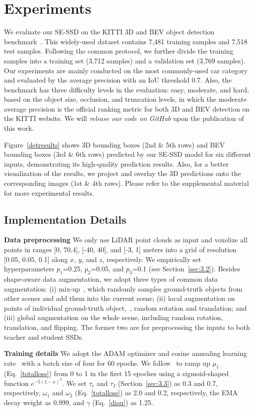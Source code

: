 \documentclass[letterpaper]{article}
\begin{document}
\section{Experiments}
We evaluate our SE-SSD on the KITTI 3D and BEV object detection benchmark~\cite{geiger2013vision}.
This widely-used dataset contains 7,481 training samples and 7,518 test samples.
Following the common protocol, we further divide the training samples into a training set (3,712 samples) and a validation set (3,769 samples).
Our experiments are mainly conducted on the most commonly-used car category and evaluated by the average precision with an IoU threshold 0.7.
Also, the benchmark has three difficulty levels in the evaluation: easy, moderate, and hard, based on the object size, occlusion, and truncation levels, in which the moderate average precision is the official ranking metric for both 3D and BEV detection on the KITTI website.
We will {\em release our code on GitHub\/} upon the publication of this work.

Figure~\ref{detresults} shows 3D bounding boxes (2nd \& 5th rows) and BEV bounding boxes (3rd \& 6th rows) predicted by our SE-SSD model for six different inputs, demonstrating its high-quality prediction results.
Also, for a better visualization of the results, we project and overlay the 3D predictions onto the corresponding images (1st \& 4th rows).
Please refer to the supplemental material for more experimental results.

\subsection{Implementation Details}
\textbf{Data preprocessing}
We only use LiDAR point clouds as input and voxelize all points in ranges [0, 70.4], [-40, 40], and [-3, 1] meters into a grid of resolution [0.05, 0.05, 0.1] along $x$, $y$, and $z$, respectively.
We empirically set hyperparameters $p_1$=0.25, $p_2$=0.05, and $p_3$=0.1 (see Section~\ref{sec:3.2}).
Besides shape-aware data augmentation, we adopt three types of common data augmentation:
(i) mix-up~\cite{yan2018second}, which randomly samples ground-truth objects from other scenes and add them into the current scene;
(ii) local augmentation on points of individual ground-truth object,~\eg, random rotation and translation; and
(iii) global augmentation on the whole scene, including random rotation, translation, and flipping.
The former two are for preprocessing the inputs to both teacher and student SSDs.


\textbf{Training details}
We adopt the ADAM optimizer and cosine annealing learning rate~\cite{loshchilov2016sgdr} with a batch size of four for 60 epochs.
We follow~\cite{tarvainen2017mean} to ramp up $\mu_t$ (Eq.~\eqref{totalloss}) from 0 to 1 in the first 15 epoches using a sigmoid-shaped function $e^{-5(1-x)^2}$.
We set
$\tau_{c}$ and ${\tau_{I}}$ (Section~\ref{sec:3.3}) as 0.3 and 0.7, respectively,
$\omega_1$ and $\omega_2$ (Eq.~\eqref{totalloss}) as 2.0 and 0.2, respectively,
the EMA decay weight as 0.999, and
$\gamma$ (Eq.~\eqref{diou}) as 1.25.
\end{document}
